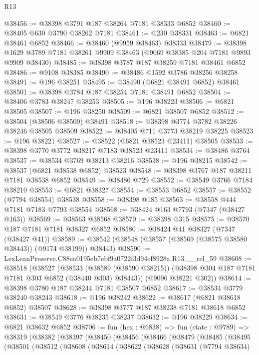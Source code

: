 \begin{lexlean}{R13}
\begin{coremodule}
@38456 := @38398 @3791 @187 @38264 @7181 @38333 @6852
@38460 := @38405 @630 @3790 @38262 @7181
@38461 := @230 @38331
@38463 := @6821 @38461 @6852
@38466 := @38460 (@9959 @38463) @38333
@38479 := @38398 @1629 @3789 @7181 @38261 @9909 @38463 (@9069 @38385 @204 @7181 @9893 @9909 @38430)
@38485 := @38398 @3787 @187 @38259 @7181 @38461 @6852
@38486 := @9108 @38385
@38490 := @38486 @1592 @3786 @38256 @38258
@38491 := @196 @38251
@38495 := @38490 (@6821 @38491 @6852) @38461
@38501 := @38398 @3784 @187 @38254 @7181 @38491 @6852
@38504 := @38406 @3783 @38247 @38253
@38505 := @196 @38223
@38506 := @6821 @38505
@38507 := @196 @38250
@38509 := @6821 @38507 @6852
@38512 := @38504 (@38506 @38509) @38491
@38518 := @38398 @3774 @3782 @38226 @38246 @38505 @38509
@38522 := @38405 @711 @3773 @38219 @38225
@38523 := @196 @38221
@38527 := @38522 (@6821 @38523 @23411) @38505
@38533 := @38398 @3770 @3772 @38217 @7183 @38523 @23411
@38534 := @38486 @3764
@38537 := @38534 @3769 @38213 @38216
@38538 := @196 @38215
@38542 := @38537 (@6821 @38538 @6852) @38523
@38548 := @38398 @3767 @187 @38211 @7181 @38538 @6852
@38549 := @38486 @729
@38552 := @38549 @3766 @7184 @38210
@38553 := @6821 @38327
@38554 := @38553 @6852
@38557 := @38552 (@7794 @38554) @38538
@38558 := @38398 @185
@38563 := @38558 @444 @7181 @7183 @7793 @38554
@38568 := @38424 @163 @7793 (@7347 (@38427 @163))
@38569 := @38563 @38568
@38570 := @38398 @315
@38575 := @38570 @187 @7181 @7181 @38327 @6852
@38580 := @38424 @41 @38327 (@7347 (@38427 @41))
@38589 := @38542 (@38548 (@38557 (@38569 (@38575 @38580 @38443)) (@9174 @38199)) @38443)
@38590 := LexLeanPreserve.C88ea0195eb7ebf9a0722f3d94ef8928a.R13.__rel_59
@38608 := @38518
    (@38527
      (@38533
        (@38589 (@38590 @38215))
        (@38398 @304 @187 @7181 @7181 @303 @6852 (@38440 @303) @38443))
      (@9096 @38221 @302))
@38614 := @38398 @3780 @187 @38244 @7181 @38507 @6852
@38617 := @38534 @3779 @38240 @38243
@38618 := @196 @38242
@38622 := @38617 (@6821 @38618 @6852) @38507
@38628 := @38398 @3777 @187 @38238 @7181 @38618 @6852
@38631 := @38549 @3776 @38235 @38237
@38632 := @196 @38229
@38634 := @6821 @38632 @6852
@38706 := fun (hex : @6838) =>
  fun (state : @9789) =>
  @38319
    (@38382
      (@38397
        (@38450
          (@38456
            (@38466
              (@38479
                (@38485
                  (@38495
                    (@38501
                      (@38512
                        (@38608
                          (@38614
                            (@38622
                              (@38628
                                (@38631
                                  (@7794 @38634)

\end{coremodule}
\end{lexlean}
